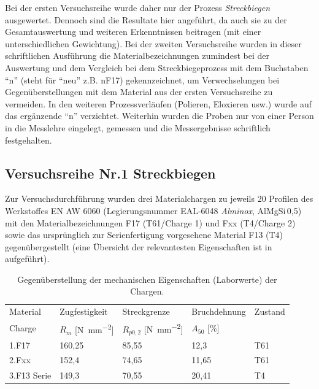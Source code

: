 \documentclass[12pt,a4paper,parskip,twoside,BCOR5mm,headsepline]{scrartcl}
\begin{document}
Bei der ersten Versuchsreihe wurde daher nur der Prozess \emph{Streckbiegen} ausgewertet. Dennoch sind die Resultate hier angeführt, da auch sie zu der Gesamtauswertung und weiteren Erkenntnissen beitragen (mit einer unterschiedlichen Gewichtung). Bei der zweiten Versuchsreihe wurden in dieser schriftlichen Ausführung die Materialbezeichnungen zumindest bei der Auswertung und dem Vergleich bei dem Streckbiegeprozess mit dem Buchstaben "`n"' (steht für "`neu"' z.B. nF17) gekennzeichnet, um Verwechselungen bei Gegenüberstellungen mit dem Material aus der ersten Versuchsreihe zu vermeiden. In den weiteren Prozessverläufen (Polieren, Eloxieren usw.) wurde auf das ergänzende "`n"' verzichtet. Weiterhin wurden die Proben nur von einer Person in die Messlehre eingelegt, gemessen und die Messergebnisse schriftlich festgehalten.	 	


\subsection{Versuchsreihe Nr.1 Streckbiegen}
\label{sec:versuchsreihe1}
Zur Versuchsdurchführung wurden drei Materialchargen zu jeweils 20 Profilen des Werkstoffes EN AW 6060 (Legierungsnummer EAL-6048 \emph{Alminox}, AlMgSi\,0,5) mit den Materialbezeichnungen F17 (T61/Charge 1) und Fxx (T4/Charge 2) sowie das ursprünglich zur Serienfertigung vorgesehene Material F13 (T4)  gegenübergestellt (eine Übersicht der relevantesten Eigenschaften ist in  aufgeführt).
\begin{table}[hbtp]
\caption{Gegenüberstellung der mechanischen Eigenschaften (Laborwerte) der Chargen.}
\label{tab:chargeneigenschaften}
\centering
\begin{tabular}{lllll}
\toprule
Material & Zugfestigkeit & Streckgrenze & Bruchdehnung & Zustand \\
Charge &  $R_m $ [\si{\newton\per\milli\meter\squared}] &  $R_{p0,2}$ [\si{\newton\per\milli\meter\squared}] &  $A_{50}$ [\%] & \\
\midrule
1.F17 & 160,25 & 85,55 &  12,3  & T61 \\
2.Fxx & 152,4 & 74,65 &   11,65  & T61 \\
3.F13 Serie & 149,3 & 70,55 & 20,41  & T4 \\
\bottomrule




\end{tabular}
\end{table}
\end{document}
